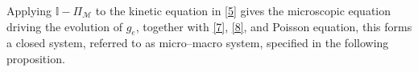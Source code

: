 \documentclass[pdflatex,final,10pt]{article}
\newcommand{\Fabrice}[1]{#1}
\newcommand{\Del}[1]{#1}
\begin{document}
Applying $\mathbb{I}-\Pi_{\mathcal{M}}$ to the kinetic equation in \eqref{5} gives the microscopic equation \Del{driving the evolution of $g_e$,}
together with \eqref{7}, \eqref{8}, and Poisson equation, this forms a closed \Fabrice{system, referred to as }micro--macro system\Del{, specified in the following proposition.}
\end{document}
